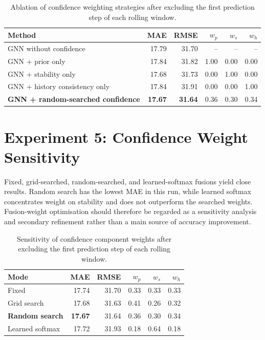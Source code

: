 \documentclass[12pt,a4paper]{report}
\begin{document}
	\begin{table}[H]
	    \centering
\caption{Ablation of confidence weighting strategies after excluding the first prediction step of each rolling window.}
	    \label{tab:causal-confidence-ablation}
	    \begin{tabular}{lrrrrr}
	        \toprule
	        Method & MAE & RMSE & $w_p$ & $w_s$ & $w_h$ \\
	        \midrule
        GNN without confidence & 17.79 & 31.70 & -- & -- & -- \\
        GNN + prior only & 17.84 & 31.82 & 1.00 & 0.00 & 0.00 \\
        GNN + stability only & 17.68 & 31.73 & 0.00 & 1.00 & 0.00 \\
        GNN + history consistency only & 17.84 & 31.91 & 0.00 & 0.00 & 1.00 \\
        \textbf{GNN + random-searched confidence} & \textbf{17.67} & \textbf{31.64} & 0.36 & 0.30 & 0.34 \\
	        \bottomrule
	    \end{tabular}
	\end{table}
	
	\section{Experiment 5: Confidence Weight Sensitivity}
	
Fixed, grid-searched, random-searched, and learned-softmax fusions yield close results. Random search has the lowest MAE in this run, while learned softmax concentrates weight on stability and does not outperform the searched weights. Fusion-weight optimisation should therefore be regarded as a sensitivity analysis and secondary refinement rather than a main source of accuracy improvement.
	
	\begin{table}[H]
	    \centering
\caption{Sensitivity of confidence component weights after excluding the first prediction step of each rolling window.}
	    \label{tab:causal-confidence-sensitivity}
	    \begin{tabular}{lrrrrr}
	        \toprule
	        Mode & MAE & RMSE & $w_p$ & $w_s$ & $w_h$ \\
	        \midrule
        Fixed & 17.74 & 31.70 & 0.33 & 0.33 & 0.33 \\
        Grid search & 17.68 & 31.63 & 0.41 & 0.26 & 0.32 \\
        \textbf{Random search} & \textbf{17.67} & 31.64 & 0.36 & 0.30 & 0.34 \\
        Learned softmax & 17.72 & 31.93 & 0.18 & 0.64 & 0.18 \\
	        \bottomrule
	    \end{tabular}
	\end{table}
	
\end{document}

